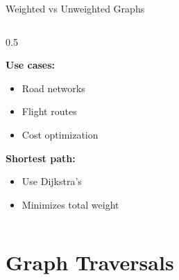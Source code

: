 \documentclass[aspectratio=169]{beamer}
\begin{document}
\begin{frame}{Weighted vs Unweighted Graphs}
\begin{columns}[T]
\begin{column}{0.5\textwidth}
\begin{center}
      \end{center}

      \textbf{Use cases:}
      \begin{itemize}
        \item Road networks
        \item Flight routes
        \item Cost optimization
      \end{itemize}

      \textbf{Shortest path:}
      \begin{itemize}
        \item Use Dijkstra's
        \item Minimizes total weight
      \end{itemize}
    \end{column}
  \end{columns}
\end{frame}

\section{Graph Traversals}
\end{document}
